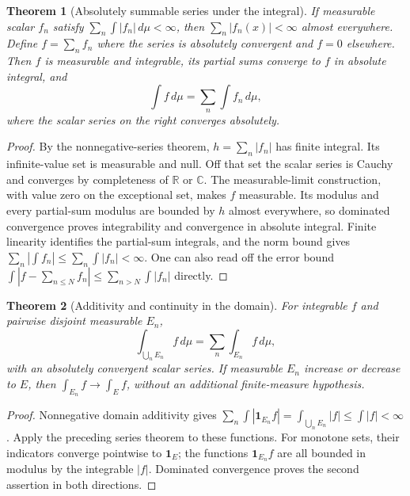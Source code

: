 \documentclass[11pt,oneside,openany]{book}
\newtheorem{theorem}{Theorem}[chapter]
\theoremstyle{definition}
\theoremstyle{remark}
\newcommand{\R}{\mathbb R}\newcommand{\C}{\mathbb C}
\newcommand{\one}{\mathbf1}\newcommand{\ind}[1]{\mathbf1_{#1}}
\newcommand{\family}[1]{}
\begin{document}
\begin{theorem}[Absolutely summable series under the integral]
\family{D11.06.absolute_series_interchange}\label{d11:06:absolute-series-interchange}
If measurable scalar $f_n$ satisfy $\sum_n\int|f_n|\,d\mu<\infty$, then
$\sum_n|f_n(x)|<\infty$ almost everywhere. Define $f=\sum_nf_n$ where
the series is absolutely convergent and $f=0$ elsewhere. Then $f$ is
measurable and integrable, its partial sums converge to $f$ in absolute
integral, and
\[
 \int f\,d\mu=\sum_n\int f_n\,d\mu,
\]
where the scalar series on the right converges absolutely.
\end{theorem}
\begin{proof}
By the nonnegative-series theorem, $h=\sum_n|f_n|$ has finite integral.
Its infinite-value set is measurable and null. Off that set the scalar
series is Cauchy and converges by completeness of $\R$ or $\C$.
The measurable-limit construction, with value zero on the exceptional set,
makes $f$ measurable. Its modulus and every partial-sum modulus are bounded
by $h$ almost everywhere, so dominated convergence proves integrability
and convergence in absolute integral. Finite linearity identifies the
partial-sum integrals, and the norm bound gives
$\sum_n|\int f_n|\leq\sum_n\int|f_n|<\infty$.
One can also read off the error bound
$\int|f-\sum_{n\leq N}f_n|\leq\sum_{n>N}\int|f_n|$ directly.
\end{proof}

\begin{theorem}[Additivity and continuity in the domain]
\family{D11.06.scalar_domain_additivity}\label{d11:06:scalar-domain-additivity}
For integrable $f$ and pairwise disjoint measurable $E_n$,
\[
 \int_{\bigcup_nE_n}f\,d\mu=\sum_n\int_{E_n}f\,d\mu,
\]
with an absolutely convergent scalar series. If measurable $E_n$ increase
or decrease to $E$, then $\int_{E_n}f\to\int_Ef$, without an additional
finite-measure hypothesis.
\end{theorem}
\begin{proof}
Nonnegative domain additivity gives
$\sum_n\int|\one_{E_n}f|=\int_{\bigcup_nE_n}|f|\leq\int|f|<\infty$.
Apply the preceding series theorem to these functions. For monotone sets,
their indicators converge pointwise to $\one_E$; the functions
$\one_{E_n}f$ are all bounded in modulus by the integrable $|f|$.
Dominated convergence proves the second assertion in both directions.
\end{proof}
\end{document}
